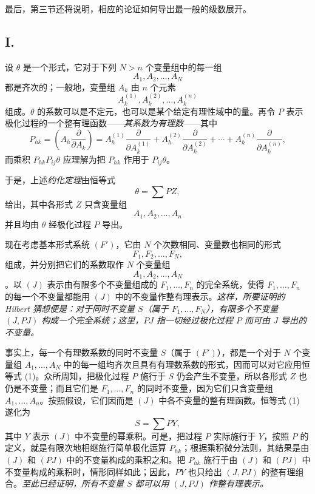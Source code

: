 \documentclass[11pt]{article}
\begin{document}
最后，第三节还将说明，相应的论证如何导出最一般的级数展开。

\subsection*{I.}
设 $\theta$ 是一个形式，它对于下列 $N>n$ 个变量组中的每一组
\[
  A_1,A_2,\ldots,A_N
\]
都是齐次的；一般地，变量组 $A_k$ 由 $n$ 个元素
\[
  A_k^{(1)},A_k^{(2)},\ldots,A_k^{(n)}
\]
组成。$\theta$ 的系数可以是不定元，也可以是某个给定有理性域中的量。再令 $P$ 表示极化过程的一个整有理函数——\emph{其系数为有理数}——其中
\[
  P_{hk}=\left(A_h\frac{\partial}{\partial A_k}\right)
  =A_h^{(1)}\frac{\partial}{\partial A_k^{(1)}}+
   A_h^{(2)}\frac{\partial}{\partial A_k^{(2)}}+
   \cdots+
   A_h^{(n)}\frac{\partial}{\partial A_k^{(n)}},
\]
而乘积 $P_{hk}P_{ij}\theta$ 应理解为把 $P_{hk}$ 作用于 $P_{ij}\theta$。

于是，上述\emph{约化定理}由恒等式
\begin{equation}
  \theta=\sum PZ,
\tag{1}
\end{equation}
给出，其中各形式 $Z$ 只含变量组
\[
  A_1,A_2,\ldots,A_n
\]
并且均由 $\theta$ 经极化过程 $P$ 导出。

现在考虑基本形式系统 $(F')$，它由 $N$ 个次数相同、变量数也相同的形式
\[
  F_1,F_2,\ldots,F_N,
\]
组成，并分别把它们的系数取作 $N$ 个变量组
\[
  A_1,A_2,\ldots,A_N
\]
。以 $(J)$ 表示由有限多个不变量组成的 $F_1,\ldots,F_n$ 的完全系统，使得 $F_1,\ldots,F_n$ 的每一个不变量都能用 $(J)$ 中的不变量作整有理表示。\emph{这样，所要证明的 Hilbert 猜想便是：对于同时不变量 $S$（属于 $F_1,\ldots,F_N$），有限多个不变量 $(J,PJ)$ 构成一个完全系统；这里，$PJ$ 指一切经过极化过程 $P$ 而可由 $J$ 导出的不变量。}

事实上，每一个有理数系数的同时不变量 $S$（属于 $(F')$），都是一个对于 $N$ 个变量组 $A_1,\ldots,A_N$ 中的每一组均齐次且具有有理数系数的形式，因而可以对它应用恒等式 (1)。众所周知，把极化过程 $P$ 施行于 $S$ 仍会产生不变量，所以各形式 $Z$ 也仍是不变量；而且它们是 $F_1,
\ldots,F_n$ 的同时不变量，因为它们只含变量组 $A_1,
\ldots,A_n$。按照假设，它们因而是 $(J)$ 中各不变量的整有理函数。恒等式 (1) 遂化为
\[
  S=\sum PY,
\]
其中 $Y$ 表示 $(J)$ 中不变量的幂乘积。可是，把过程 $P$ 实际施行于 $Y$，按照 $P$ 的定义，就是有限次地相继施行简单极化运算 $P_{hk}$；根据乘积微分法则，其结果是由 $(J)$ 和 $(PJ)$ 中的不变量构成的乘积之和。把 $P_{hk}$ 施行于由 $(J)$ 和 $(PJ)$ 中不变量构成的乘积时，情形同样如此；因此，$PY$ 也只给出 $(J,PJ)$ 的整有理组合。\emph{至此已经证明，所有不变量 $S$ 都可以用 $(J,PJ)$ 作整有理表示。}
\end{document}
